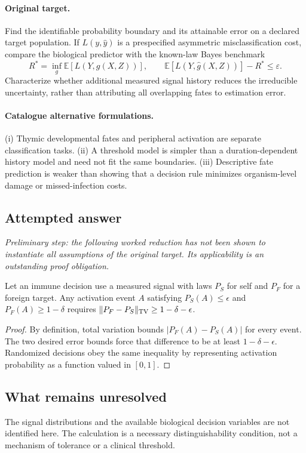 \documentclass[11pt]{article}
\begin{document}
\paragraph{Original target.}
Find the identifiable probability boundary and its attainable error on a declared target population. If $L(y,\widehat y)$ is a prespecified asymmetric misclassification cost, compare the biological predictor with the known-law Bayes benchmark
    \[R^*=\inf_g\mathbb{E}[L(Y,g(X,Z))],\qquad
    \mathbb{E}[L(Y,\widehat g(X,Z))]-R^*\leq\varepsilon.\]
    Characterize whether additional measured signal history reduces the irreducible uncertainty, rather than attributing all overlapping fates to estimation error.
\paragraph{Catalogue alternative formulations.}
(i) Thymic developmental fates and peripheral activation are separate classification tasks. (ii) A threshold model is simpler than a duration-dependent history model and need not fit the same boundaries. (iii) Descriptive fate prediction is weaker than showing that a decision rule minimizes organism-level damage or missed-infection costs.
\subsection{Attempted answer}
\noindent\emph{Preliminary step: the following worked reduction has not been shown to instantiate all assumptions of the original target. Its applicability is an outstanding proof obligation.}

\begin{proposition}
Let an immune decision use a measured signal with laws $P_S$ for self and $P_F$ for a foreign target. Any activation event $A$ satisfying $P_S(A)\leq\epsilon$ and $P_F(A)\geq1-\delta$ requires $\|P_F-P_S\|_{\rm TV}\geq1-\delta-\epsilon$.
\end{proposition}
\begin{proof}
By definition, total variation bounds $|P_F(A)-P_S(A)|$ for every event. The two desired error bounds force that difference to be at least $1-\delta-\epsilon$. Randomized decisions obey the same inequality by representing activation probability as a function valued in $[0,1]$.
\end{proof}
\subsection{What remains unresolved}
The signal distributions and the available biological decision variables are not identified here. The calculation is a necessary distinguishability condition, not a mechanism of tolerance or a clinical threshold.
\end{document}
